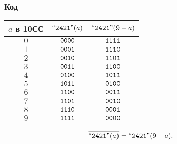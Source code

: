 \begin{frame}
    \frametitle{Код \AikenLabel}
    
    \begin{center}
    \begin{tabular}{|c|c|c|}
        \hline\hline
        $a$ в 10СС  & $\text{``\texttt{2421}''}(a)$       & $\text{``\texttt{2421}''}(9-a)$\\
        \hline\hline                   
        $0$         & $\texttt{0000}$   & $\texttt{1111}$ \\
        $1$         & $\texttt{0001}$   & $\texttt{1110}$ \\
        $2$         & $\texttt{0010}$   & $\texttt{1101}$ \\
        $3$         & $\texttt{0011}$   & $\texttt{1100}$ \\
        $4$         & $\texttt{0100}$   & $\texttt{1011}$ \\
        $5$         & $\texttt{1011}$   & $\texttt{0100}$ \\
        $6$         & $\texttt{1100}$   & $\texttt{0011}$ \\
        $7$         & $\texttt{1101}$   & $\texttt{0010}$ \\
        $8$         & $\texttt{1110}$   & $\texttt{0001}$ \\
        $9$         & $\texttt{1111}$   & $\texttt{0000}$ \\
        \hline
    \end{tabular}
    \end{center}
    
    \[
        \overline{\text{``\texttt{2421}''}(a)} = \text{``\texttt{2421}''}(9-a).
    \]
\end{frame}

